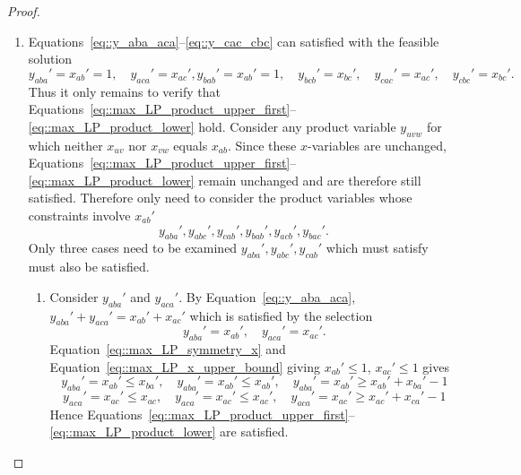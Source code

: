 \begin{proof}
\begin{enumerate}[label=\Alph*.]
\begin{enumerate}[label=(\roman*)]
        \item Since $g_{ac}=1$, Equations~\eqref{eq::max_LP_indicator_upper}--\eqref{eq::max_LP_indicator_lower} imply $z_{ac}' \geq 1$. Hence, by Equation~\eqref{eq::max_LP_indicator_arg},
          \[
          1 \leq z_{ac}'=\sum_{k\in\{a,b,c\}}y_{akc}'+x_{ac}'=y_{aac}'+y_{abc}'+y_{acc}'+x_{ac}'=y_{abc}'+x_{ac}',
          \]
          since Equations~\eqref{eq::max_LP_product_upper_first}--\eqref{eq::max_LP_product_upper_second} together with Equation~\eqref{eq::max_LP_diagonal_x} imply $y_{aac}'=y_{acc}'=0$. As $x_{ac}'=x_{ac}$, $y_{abc}' = y_{abc}$ satisfies the new equation, no additional constraints are needed. 
      \end{enumerate}
    \item Equations~\eqref{eq::y_aba_aca}--\eqref{eq::y_cac_cbc} can satisfied with the feasible solution
      \[
        y_{aba}'=x_{ab}'=1, \quad y_{aca}'=x_{ac}', y_{bab}'=x_{ab}'=1, \quad y_{bcb}'=x_{bc}', \quad y_{cac}'=x_{ac}', \quad y_{cbc}'=x_{bc}'.
      \]
      Thus it only remains to verify that Equations~\eqref{eq::max_LP_product_upper_first}--\eqref{eq::max_LP_product_lower} hold. Consider any product variable $y_{uvw}$ for which neither $x_{uv}$ nor $x_{vw}$ equals $x_{ab}$. Since these $x$-variables are unchanged, Equations~\eqref{eq::max_LP_product_upper_first}--\eqref{eq::max_LP_product_lower} remain unchanged and are therefore still satisfied. Therefore only need to consider the product variables whose constraints involve $x_{ab}'$
    \[
    y_{aba}',y_{abc}',y_{cab}',y_{bab}',y_{acb}',y_{bac}'. 
    \]
    Only three cases need to be examined $y_{aba}',y_{abc}',y_{cab}'$ which must satisfy 
      must also be satisfied.
      \begin{enumerate}[label=(\roman*)]
        \item Consider $y_{aba}'$ and $y_{aca}'$. By Equation~\eqref{eq::y_aba_aca}, $y_{aba}'+y_{aca}'=x_{ab}'+x_{ac}'$ which is satisfied by the selection
          \[
          y_{aba}'=x_{ab}',\quad y_{aca}'=x_{ac}'. 
          \] 
          Equation~\eqref{eq::max_LP_symmetry_x} and Equation~\eqref{eq::max_LP_x_upper_bound} giving $x_{ab}' \leq 1$, $x_{ac}' \leq 1$ gives
          \[
          y_{aba}'=x_{ab}' \leq x_{ba}',\quad y_{aba}'=x_{ab}'\leq x_{ab}', \quad y_{aba}'=x_{ab}' \geq x_{ab}'+x_{ba}'-1
          \]
          \[
          y_{aca}'=x_{ac}' \leq x_{ac},\quad y_{aca}'=x_{ac}' \leq x_{ac}', \quad y_{aca}'=x_{ac}' \geq x_{ac}'+x_{ca}'-1
          \]
          Hence Equations~\eqref{eq::max_LP_product_upper_first}--\eqref{eq::max_LP_product_lower} are satisfied.

\end{enumerate}
\end{enumerate}
\end{proof}
